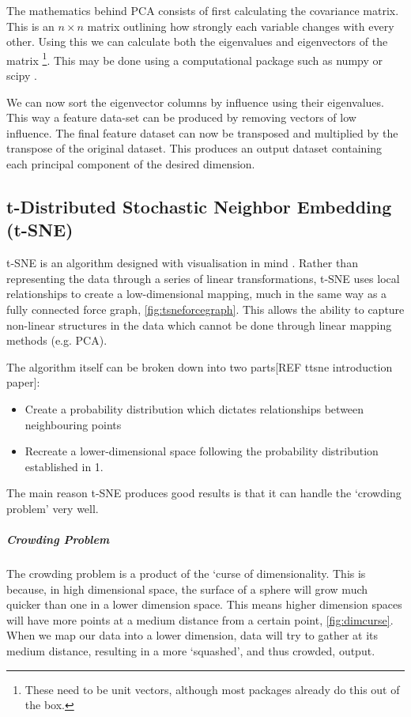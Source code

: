 The mathematics behind PCA consists of first calculating the covariance matrix. This is an $n \times n$ matrix outlining how strongly each variable changes with every other. Using this we can calculate both the eigenvalues and eigenvectors of the matrix \footnote{These need to be unit vectors, although most packages already do this out of the box.}. This may be done using a computational package such as numpy or scipy \citep{numpy,scipy}.

We can now sort the eigenvector columns by influence using their eigenvalues. This way a feature data-set can be produced by removing vectors of low influence. The final feature dataset can now be transposed and multiplied by the transpose of the original dataset. This produces an output dataset containing each principal component of the desired dimension.



\subsection{t-Distributed Stochastic Neighbor Embedding (t-SNE)}

t-SNE is an algorithm designed with visualisation in mind \citep{tsne}. Rather than representing the data through a series of linear transformations, t-SNE uses local relationships to create a low-dimensional mapping, much in the same way as a fully connected force graph, \autoref{fig:tsneforcegraph}. This allows the ability to capture non-linear structures in the data which cannot be done through linear mapping methods (e.g. PCA).

The algorithm itself can be broken down into two parts[REF ttsne introduction paper]:
\begin{itemize}
  \item [1.] Create a probability distribution which dictates relationships between neighbouring points
  \item [2.] Recreate a lower-dimensional space following the probability distribution established in 1.
\end{itemize}

The main reason t-SNE produces good results is that it can handle the `crowding problem' very well.


\subparagraph{Crowding Problem}\label{sec:overcrowd}
The crowding problem is a product of the `curse of dimensionality. This is because, in high dimensional space, the surface of a sphere will grow much quicker than one in a lower dimension space. This means higher dimension spaces will have more points at a medium distance from a certain point, \autoref{fig:dimcurse}. When we map our data into a lower dimension, data will try to gather at its medium distance, resulting in a more `squashed', and thus crowded, output.



